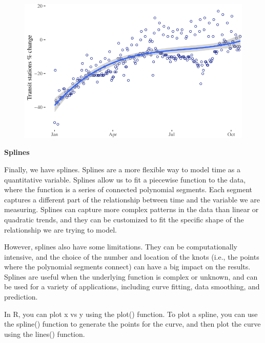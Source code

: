 \documentclass[
  letterpaper,
  DIV=11,
  numbers=noendperiod]{scrreprt}
\begin{document}
\begin{figure}[H]

{\centering \includegraphics{longitudinal-1_files/figure-pdf/unnamed-chunk-14-2.pdf}

}

\end{figure}

\textbf{Splines}

Finally, we have splines. Splines are a more flexible way to model time
as a quantitative variable. Splines allow us to fit a piecewise function
to the data, where the function is a series of connected polynomial
segments. Each segment captures a different part of the relationship
between time and the variable we are measuring. Splines can capture more
complex patterns in the data than linear or quadratic trends, and they
can be customized to fit the specific shape of the relationship we are
trying to model.

However, splines also have some limitations. They can be computationally
intensive, and the choice of the number and location of the knots (i.e.,
the points where the polynomial segments connect) can have a big impact
on the results. Splines are useful when the underlying function is
complex or unknown, and can be used for a variety of applications,
including curve fitting, data smoothing, and prediction.

In R, you can plot x vs y using the plot() function. To plot a spline,
you can use the spline() function to generate the points for the curve,
and then plot the curve using the lines() function.
\end{document}
